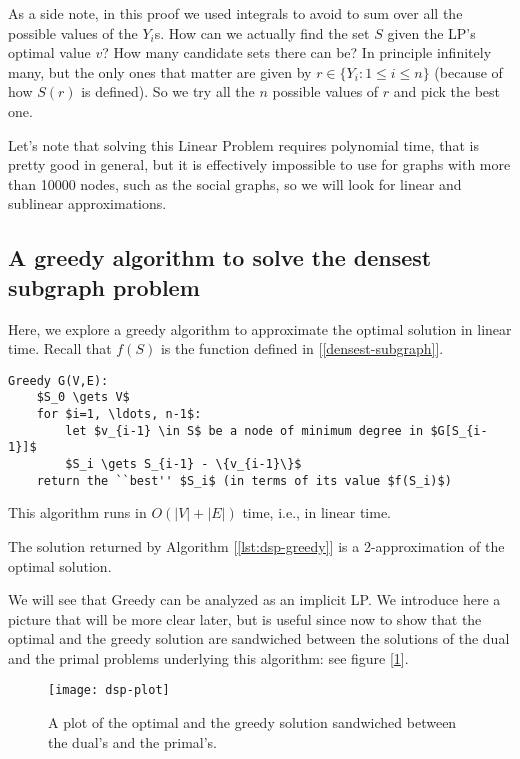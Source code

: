 As a side note, in this proof we used integrals to avoid to sum over all the possible values of the $Y_i$s. How can we actually find the set $S$ given the LP's optimal value $v$? How many candidate sets there can be? In principle infinitely many, but the only ones that matter are given by $r \in \{Y_i : 1 \leq i \leq n\}$ (because of how $S(r)$ is defined). So we try all the $n$ possible values of $r$ and pick the best one.

Let's note that solving this Linear Problem requires polynomial time, that is pretty good in general, but it is effectively impossible to use for graphs with more than 10000 nodes, such as the social graphs, so we will look for linear and sublinear approximations.


\subsection{A greedy algorithm to solve the densest subgraph problem}\label{sec:dsp-greedy}

Here, we explore a greedy algorithm to approximate the optimal solution in linear time. Recall that $f(S)$ is the function defined in [\ref{densest-subgraph}].

\begin{lstlisting}[caption={The Greedy algorithm to solve the densest subgraph problem},label={lst:dsp-greedy}]
Greedy G(V,E):
    $S_0 \gets V$
    for $i=1, \ldots, n-1$:
        let $v_{i-1} \in S$ be a node of minimum degree in $G[S_{i-1}]$
        $S_i \gets S_{i-1} - \{v_{i-1}\}$
    return the ``best'' $S_i$ (in terms of its value $f(S_i)$)
\end{lstlisting}

\begin{obs}
    This algorithm runs in $O(|V| + |E|)$ time, i.e., in linear time.
\end{obs}

\begin{thm}\label{thm:dsp-greedy}
    The solution returned by Algorithm [\ref{lst:dsp-greedy}] is a 2-approximation of the optimal solution.
\end{thm}

\begin{obs}
    We will see that Greedy can be analyzed as an implicit LP. We introduce here a picture that will be more clear later, but is useful since now to show that the optimal and the greedy solution are sandwiched between the solutions of the dual and the primal problems underlying this algorithm: see figure [\ref{fig:dsp-plot}].
    \begin{figure}[h!]
        \centering
        \texttt{[image: dsp-plot]}
        \caption{A plot of the optimal and the greedy solution sandwiched between the dual's and the primal's.}
        \label{fig:dsp-plot}
    \end{figure}
\end{obs}

